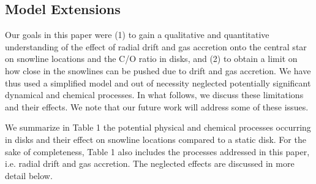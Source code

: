 \documentclass[apj]{emulateapj}
\begin{document}



\subsection{Model Extensions}
\label{sec:neglected}

Our goals in this paper were (1) to gain a qualitative and quantitative understanding of the effect of radial drift and gas accretion onto the central star on snowline locations and the C/O ratio in disks, and (2) to obtain a limit on how close in the snowlines can be pushed due to drift and gas accretion. We have thus used a simplified model and out of necessity neglected potentially significant dynamical and chemical processes. In what follows, we discuss these limitations and their effects. We note that our future work will address some of these issues. 




We summarize in Table 1 the potential physical and chemical processes occurring in disks and their effect on snowline locations compared to a static disk. For the sake of completeness, Table 1 also includes the processes addressed in this paper, i.e. radial drift and gas accretion. The neglected effects are discussed in more detail below. 
\end{document}

